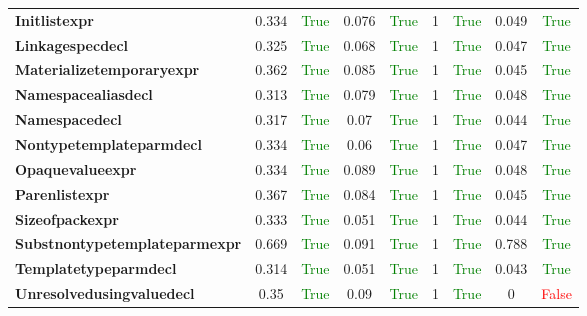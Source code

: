 \documentclass{article}
\begin{document}
\begin{xltabular}{\textwidth}{lcccccccc}
\textbf{{\fontsize{10}{12}\selectfont Initlistexpr}}& 0.334&\textcolor{green}{True}& 0.076&\textcolor{green}{True}& 1&\textcolor{green}{True}& 0.049&\textcolor{green}{True} \\[0.5ex]
\textbf{{\fontsize{10}{12}\selectfont Linkagespecdecl}}& 0.325&\textcolor{green}{True}& 0.068&\textcolor{green}{True}& 1&\textcolor{green}{True}& 0.047&\textcolor{green}{True} \\[0.5ex]
\textbf{{\fontsize{10}{12}\selectfont Materializetemporaryexpr}}& 0.362&\textcolor{green}{True}& 0.085&\textcolor{green}{True}& 1&\textcolor{green}{True}& 0.045&\textcolor{green}{True} \\[0.5ex]
\textbf{{\fontsize{10}{12}\selectfont Namespacealiasdecl}}& 0.313&\textcolor{green}{True}& 0.079&\textcolor{green}{True}& 1&\textcolor{green}{True}& 0.048&\textcolor{green}{True} \\[0.5ex]
\textbf{{\fontsize{10}{12}\selectfont Namespacedecl}}& 0.317&\textcolor{green}{True}& 0.07&\textcolor{green}{True}& 1&\textcolor{green}{True}& 0.044&\textcolor{green}{True} \\[0.5ex]
\textbf{{\fontsize{10}{12}\selectfont Nontypetemplateparmdecl}}& 0.334&\textcolor{green}{True}& 0.06&\textcolor{green}{True}& 1&\textcolor{green}{True}& 0.047&\textcolor{green}{True} \\[0.5ex]
\textbf{{\fontsize{10}{12}\selectfont Opaquevalueexpr}}& 0.334&\textcolor{green}{True}& 0.089&\textcolor{green}{True}& 1&\textcolor{green}{True}& 0.048&\textcolor{green}{True} \\[0.5ex]
\textbf{{\fontsize{10}{12}\selectfont Parenlistexpr}}& 0.367&\textcolor{green}{True}& 0.084&\textcolor{green}{True}& 1&\textcolor{green}{True}& 0.045&\textcolor{green}{True} \\[0.5ex]
\textbf{{\fontsize{10}{12}\selectfont Sizeofpackexpr}}& 0.333&\textcolor{green}{True}& 0.051&\textcolor{green}{True}& 1&\textcolor{green}{True}& 0.044&\textcolor{green}{True} \\[0.5ex]
\textbf{{\fontsize{10}{12}\selectfont Substnontypetemplateparmexpr}}& 0.669&\textcolor{green}{True}& 0.091&\textcolor{green}{True}& 1&\textcolor{green}{True}& 0.788&\textcolor{green}{True} \\[0.5ex]
\textbf{{\fontsize{10}{12}\selectfont Templatetypeparmdecl}}& 0.314&\textcolor{green}{True}& 0.051&\textcolor{green}{True}& 1&\textcolor{green}{True}& 0.043&\textcolor{green}{True} \\[0.5ex]
\textbf{{\fontsize{10}{12}\selectfont Unresolvedusingvaluedecl}}& 0.35&\textcolor{green}{True}& 0.09&\textcolor{green}{True}& 1&\textcolor{green}{True}& 0&\textcolor{red}{False} \\[0.5ex]

\end{xltabular}
\end{document}

